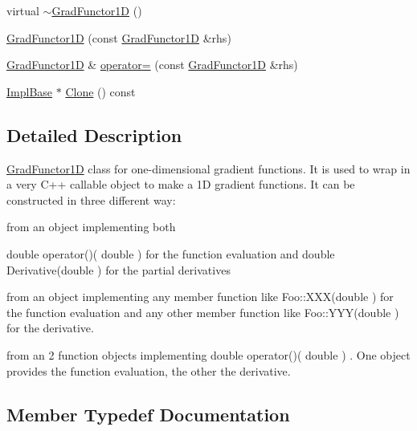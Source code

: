 \begin{DoxyCompactItemize}
\item 
virtual \mbox{\hyperlink{classROOT_1_1Math_1_1GradFunctor1D_ac711d3cc551b961aa16ecdcbf50308d6}{$\sim$\+Grad\+Functor1D}} ()
\item 
\mbox{\hyperlink{classROOT_1_1Math_1_1GradFunctor1D_af43388b384674d1e811cfbc1ad562816}{Grad\+Functor1D}} (const \mbox{\hyperlink{classROOT_1_1Math_1_1GradFunctor1D}{Grad\+Functor1D}} \&rhs)
\item 
\mbox{\hyperlink{classROOT_1_1Math_1_1GradFunctor1D}{Grad\+Functor1D}} \& \mbox{\hyperlink{classROOT_1_1Math_1_1GradFunctor1D_a3ea006d92100ba76a6fae9f57499c60d}{operator=}} (const \mbox{\hyperlink{classROOT_1_1Math_1_1GradFunctor1D}{Grad\+Functor1D}} \&rhs)
\item 
\mbox{\hyperlink{classROOT_1_1Math_1_1GradFunctor1D_a16b436a0d100aa6c16ee66961c4f5b97}{Impl\+Base}} $\ast$ \mbox{\hyperlink{classROOT_1_1Math_1_1GradFunctor1D_ab8280aaf240a374fb7a67808d858af79}{Clone}} () const
\end{DoxyCompactItemize}


\subsection{Detailed Description}
\mbox{\hyperlink{classROOT_1_1Math_1_1GradFunctor1D}{Grad\+Functor1D}} class for one-\/dimensional gradient functions. It is used to wrap in a very C++ callable object to make a 1D gradient functions. It can be constructed in three different way\+: 
\begin{DoxyEnumerate}
\item from an object implementing both

double operator()( double  ) for the function evaluation and double Derivative(double ) for the partial derivatives 
\item from an object implementing any member function like Foo\+::\+X\+X\+X(double ) for the function evaluation and any other member function like Foo\+::\+Y\+Y\+Y(double ) for the derivative. 
\item from an 2 function objects implementing double operator()( double ) . One object provides the function evaluation, the other the derivative. 
\end{DoxyEnumerate}

\subsection{Member Typedef Documentation}
\mbox{\label{classROOT_1_1Math_1_1GradFunctor1D_a76566ff5310b5900b8df38e0884b3210}} 
